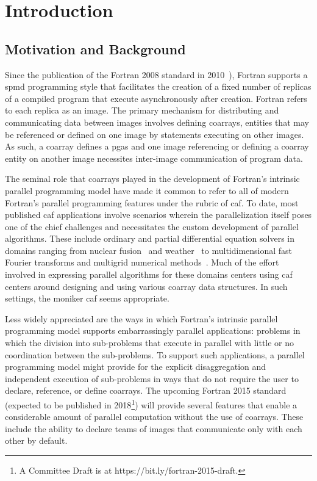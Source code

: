 \section{Introduction}
\subsection{Motivation and Background}
Since the publication of the Fortran 2008 standard in 2010~\cite{iso2010information}), Fortran supports a \gls{spmd} programming style
that facilitates the creation of a fixed number of replicas of a compiled program that execute asynchronously after creation.
Fortran refers to each replica as an image.  The primary mechanism for distributing and communicating data between
images involves defining \glspl{coarray}, entities that may be referenced or defined on one image by statements executing on
other images. As such, a coarray defines a \gls{pgas} and one image referencing or defining a coarray entity on another image
necessites inter-image communication of program data.

The seminal role that \glspl{coarray} played in the development of Fortran's intrinsic parallel programming model have made it
common to refer to all of modern Fortran's parallel programming features under the rubric of \gls{caf}.  To date, most
published \gls{caf} applications involve scenarios wherein the parallelization itself poses one of the chief
challenges and necessitates the custom development of parallel algorithms.  These include ordinary and partial differential
equation solvers in domains ranging from nuclear fusion~\cite{preissl2011multithreaded} and
weather~\cite{mozdzynski2015partitioned} to multidimensional fast Fourier transforms and multigrid numerical
methods~\cite{garain2015comparing}.  Much of the effort involved in expressing parallel algorithms for these domains centers
 using \gls{caf} centers around designing and using various \gls{coarray} data structures.  In such settings, the moniker
\gls{caf} seems appropriate.

Less widely appreciated are the ways in which Fortran's intrinsic parallel programming model supports embarrassingly parallel
applications: problems in which the division into sub-problems that execute in parallel with little or no coordination between
the sub-problems.  To support such applications, a parallel programming model might provide for the explicit disaggregation
and independent execution of sub-problems in ways that do not require the user to declare, reference, or define \glspl{coarray}.
The upcoming Fortran 2015 standard (expected to be published in 2018\footnote{A Committee Draft is at
https://bit.ly/fortran-2015-draft.}) will provide several features that enable a considerable amount of parallel computation
without the use of \glspl{coarray}.  These include the ability to declare teams of images that communicate only with each
other by default.

